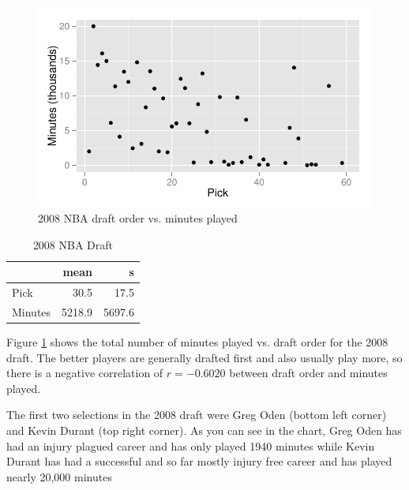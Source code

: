 \documentclass[letterpaper, landscape]{exam}
\begin{document}
\begin{questions}
\begin{parts}
        \end{parts}
      
      \newpage

      \question
        \label{q:draft}

        \begin{figure}[H]
          \centering
          \includegraphics[scale = 1]{figures/draft.pdf}
          \caption{2008 NBA draft order vs. minutes played}
          \label{fig:draft}
        \end{figure}

        \begin{table}[H]
          \centering
          \begin{tabular}{lrr}
            \toprule
                     & mean   & s \\
            \midrule
            Pick     & 30.5   & 17.5 \\
            Minutes  & 5218.9 & 5697.6 \\
            \bottomrule
          \end{tabular}
          \caption{2008 NBA Draft}
        \end{table}

        Figure \ref{fig:draft} shows the total number of minutes played vs.  draft
        order for the 2008 draft.  The better players are generally drafted first
        and also usually play more, so there is a negative correlation of 
        $r = -0.6020$ between draft order and minutes played.

        The first two selections in the 2008 draft were Greg Oden (bottom left
        corner) and Kevin Durant (top right corner).  As you can see in the
        chart, Greg Oden has had an injury plagued career and has only played
        1940 minutes while Kevin Durant has had a successful and so far mostly
        injury free career and has played nearly 20,000 minutes


\end{questions}
\end{document}
